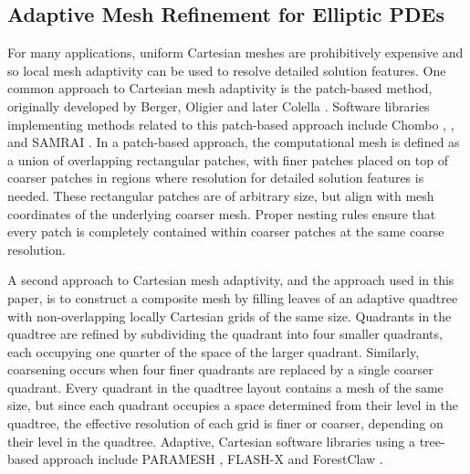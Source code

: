 

\subsection{Adaptive Mesh Refinement for Elliptic PDEs}

For many applications, uniform Cartesian meshes are prohibitively expensive and so local mesh adaptivity can be used to resolve detailed solution features.  One common approach to Cartesian mesh adaptivity is the patch-based method, originally developed by Berger, Oligier and later Colella . Software libraries implementing methods related to this patch-based approach include Chombo \citep{colella2009chombo}, \amrex \citep{zhang2019amrex}, and SAMRAI \citep{hornung2006managing}. In a patch-based approach, the computational mesh is defined as a union of overlapping rectangular patches, with finer patches placed on top of coarser patches in regions where resolution for  detailed solution features is needed.  These rectangular patches are of arbitrary size, but align with mesh coordinates of the underlying coarser mesh. Proper nesting rules ensure that every patch is completely contained within coarser patches at the same coarse resolution.

A second approach to Cartesian mesh adaptivity, and the approach used in this paper, is to construct a composite mesh by filling leaves of an adaptive quadtree with non-overlapping locally Cartesian grids of the same size. Quadrants in the quadtree are refined by subdividing the quadrant into four smaller quadrants, each occupying one quarter of the space of the larger quadrant. Similarly, coarsening occurs when four finer quadrants are replaced by a single coarser quadrant.  Every quadrant in the quadtree layout contains a mesh of the same size, but since each quadrant occupies a space determined from their level in the quadtree, the effective resolution of each grid is finer or coarser, depending on their level in the quadtree.  Adaptive, Cartesian software libraries using a tree-based approach include PARAMESH \citep{globisch1995parmesh}, FLASH-X \citep{dubey2022flash} and ForestClaw \citep{calhoun2017forestclaw}.


